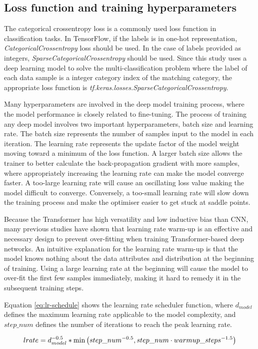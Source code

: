 \subsection{Loss function and training hyperparameters}
\label{subsec:Loss function and training hyperparameters}
The categorical crossentropy loss is a commonly used loss function in classification tasks.
In TensorFlow, if the labels is in one-hot representation, \textit{CategoricalCrossentropy} loss should be used.
In the case of labels provided as integers, \textit{SparseCategoricalCrossentropy} should be used.
Since this study uses a deep learning model to solve the multi-classification problem where the label of each data sample is a integer category index of the matching category, the appropriate loss function is \textit{tf.keras.losses.SparseCategoricalCrossentropy}.

Many hyperparameters are involved in the deep model training process, where the model performance is closely related to fine-tuning.
The process of training any deep model involves two important hyperparameters, batch size and learning rate.
The batch size represents the number of samples input to the model in each iteration.
The learning rate represents the update factor of the model weight moving toward a minimum of the loss function.
A larger batch size allows the trainer to better calculate the back-propagation gradient with more samples, where appropriately increasing the learning rate can make the model converge faster.
A too-large learning rate will cause an oscillating loss value making the model difficult to converge.
Conversely, a too-small learning rate will slow down the training process and make the optimiser easier to get stuck at saddle points.

Because the Transformer has high versatility and low inductive bias than CNN, many previous studies have shown that learning rate warm-up is an effective and necessary design to prevent over-fitting when training Transformer-based deep networks.
An intuitive explanation for the learning rate warm-up is that the model knows nothing about the data attributes and distribution at the beginning of training.
Using a large learning rate at the beginning will cause the model to over-fit the first few samples immediately, making it hard to remedy it in the subsequent training steps.

Equation \ref{eq:lr-schedule} shows the learning rate scheduler function, where $d_{model}$ defines the maximum learning rate applicable to the model complexity, and $step\_num$ defines the number of iterations to reach the peak learning rate.

\begin{equation}
    lrate=d_{model}^{-0.5} * \min \left(step\_num^{-0.5}, step\_num \cdot  warmup\_steps^{-1.5}\right)
    \eqcite{vaswani2017attention}
    \label{eq:lr-schedule}
\end{equation}
